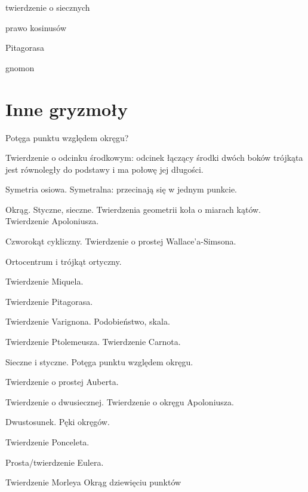 \documentclass{parchment}
\begin{document}


twierdzenie o siecznych

prawo kosinusów

Pitagorasa %

gnomon %

\section{Inne gryzmoły}




Potęga punktu względem okręgu?

Twierdzenie o odcinku środkowym: odcinek łączący środki dwóch boków trójkąta jest równoległy do podstawy i ma połowę jej długości.

Symetria osiowa.
Symetralna: przecinają się w jednym punkcie.

Okrąg.
Styczne, sieczne.
Twierdzenia geometrii koła o miarach kątów.
Twierdzenie Apoloniusza.

Czworokąt cykliczny.
Twierdzenie o prostej Wallace'a-Simsona.

Ortocentrum i trójkąt ortyczny.

Twierdzenie Miquela.

Twierdzenie Pitagorasa.

Twierdzenie Varignona.
Podobieństwo, skala.

Twierdzenie Ptolemeusza.
Twierdzenie Carnota.

Sieczne i styczne.
Potęga punktu względem okręgu.

Twierdzenie o prostej Auberta.

Twierdzenie o dwusiecznej.
Twierdzenie o okręgu Apoloniusza.

Dwustosunek.
Pęki okręgów.

Twierdzenie Ponceleta.

Prosta/twierdzenie Eulera.

Twierdzenie Morleya
Okrąg dziewięciu punktów
\end{document}
